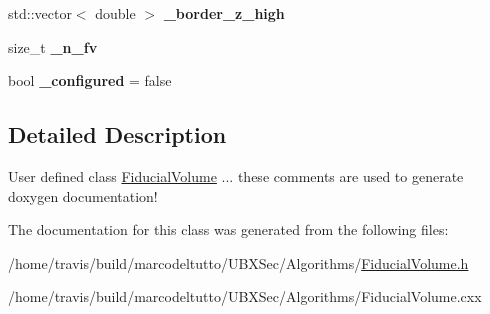 \begin{DoxyCompactItemize}
\item 
\hypertarget{classubana_1_1FiducialVolume_ac56928dd11c4c30855e7348691b394d0}{std\-::vector$<$ double $>$ {\bfseries \-\_\-border\-\_\-z\-\_\-high}}\label{classubana_1_1FiducialVolume_ac56928dd11c4c30855e7348691b394d0}

\item 
\hypertarget{classubana_1_1FiducialVolume_a4656d4c21e65e922c77d3e86af8bd20b}{size\-\_\-t {\bfseries \-\_\-n\-\_\-fv}}\label{classubana_1_1FiducialVolume_a4656d4c21e65e922c77d3e86af8bd20b}

\item 
\hypertarget{classubana_1_1FiducialVolume_a69587a1be20d319f9b9549ee36908890}{bool {\bfseries \-\_\-configured} = false}\label{classubana_1_1FiducialVolume_a69587a1be20d319f9b9549ee36908890}

\end{DoxyCompactItemize}


\subsection{Detailed Description}
User defined class \hyperlink{classubana_1_1FiducialVolume}{Fiducial\-Volume} ... these comments are used to generate doxygen documentation! 

The documentation for this class was generated from the following files\-:\begin{DoxyCompactItemize}
\item 
/home/travis/build/marcodeltutto/\-U\-B\-X\-Sec/\-Algorithms/\hyperlink{FiducialVolume_8h}{Fiducial\-Volume.\-h}\item 
/home/travis/build/marcodeltutto/\-U\-B\-X\-Sec/\-Algorithms/Fiducial\-Volume.\-cxx\end{DoxyCompactItemize}
